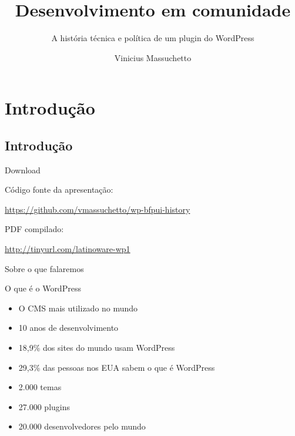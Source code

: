 \documentclass[handout]{beamer}
\title{Desenvolvimento em comunidade}
\subtitle{A história técnica e política de um plugin do WordPress}
\author{Vinicius Massuchetto}
\date{}
\begin{document}
\frame{\titlepage}

\section{Introdução}
\subsection{Introdução}

\begin{frame}{Download}
\begin{center}

  Código fonte da apresentação:

  \vspace{0.1cm}

  \url{https://github.com/vmassuchetto/wp-bfpui-history}

  \vspace{0.5cm}

  PDF compilado:

  \vspace{0.1cm}

  \url{http://tinyurl.com/latinoware-wp1}

\end{center}
\end{frame}

\begin{frame}{Sobre o que falaremos}
  \tableofcontents[subsectionstyle=hide]
\end{frame}

\begin{frame}{O que é o WordPress}
\begin{itemize}
  \pause \item O CMS mais utilizado no mundo
  \pause \item 10 anos de desenvolvimento
  \pause \item 18,9\% dos sites do mundo usam WordPress
  \pause \item 29,3\% das pessoas nos EUA sabem o que é WordPress
  \pause \item 2.000 temas
  \pause \item 27.000 plugins
  \pause \item 20.000 desenvolvedores pelo mundo
\end{itemize}
\end{frame}
\end{document}

